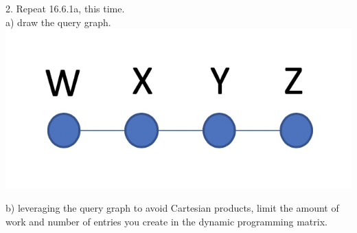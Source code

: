 \documentclass[12pt, letterpaper, fleqn]{article}
\begin{document}
  2. Repeat 16.6.1a, this time.  \\
  a) draw the query graph.   \\
  \includegraphics[scale=0.5]{query_graph.png}


  b) leveraging the 
  query graph to avoid Cartesian products, limit the amount of work and number
  of entries you create in the dynamic programming matrix. \\
\end{document}
